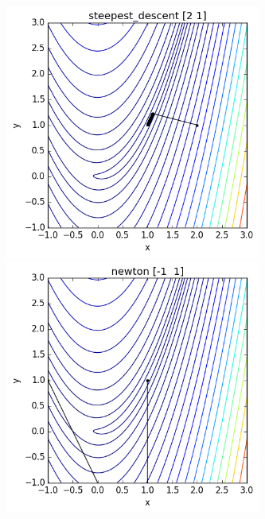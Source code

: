 \documentclass[11pt]{article}
\begin{document}
\pagebreak

\begin{figure}[h!]
  \includegraphics[width=3.3in]{rosenbrock-steepest-descent2.png}
  \includegraphics[width=3.3in]{rosenbrock-newton-1.png}
\end{figure}
\end{document}
